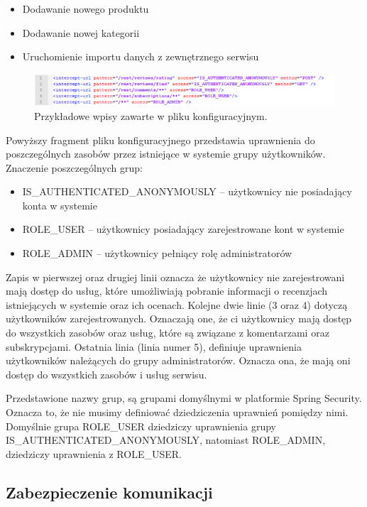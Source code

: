\begin{itemize}
\item Dodawanie nowego produktu
\item Dodawanie nowej kategorii
\item Uruchomienie importu danych z zewnętrznego serwisu
\end{itemize}

\begin{figure}[h]
	\centering
	\includegraphics[scale=0.7]{images/model_uprawnien_xml.png}
	\caption{Przykładowe wpisy zawarte w pliku konfiguracyjnym.}
\end{figure}

Powyższy fragment pliku konfiguracyjnego przedstawia uprawnienia do poszczególnych zasobów przez istniejące w systemie grupy użytkowników. Znaczenie poszczególnych grup:

\begin{itemize}
\item IS\_AUTHENTICATED\_ANONYMOUSLY – użytkownicy nie posiadający konta w systemie
\item ROLE\_USER – użytkownicy posiadający zarejestrowane kont w systemie
\item ROLE\_ADMIN – użytkownicy pełniący rolę administratorów
\end{itemize}

 Zapis w pierwszej oraz drugiej linii oznacza że użytkownicy nie zarejestrowani mają dostęp do usług, które umożliwiają pobranie informacji o recenzjach istniejących w systemie oraz ich ocenach.
Kolejne dwie linie (3 oraz 4) dotyczą użytkowników zarejestrowanych. Oznaczają one, że ci użytkownicy mają dostęp do wszystkich zasobów oraz usług, które są związane z komentarzami oraz subskrypcjami.
Ostatnia linia (linia numer 5), definiuje uprawnienia użytkowników należących do grupy administratorów. Oznacza ona, że mają oni dostęp do wszystkich zasobów i usług serwisu.

Przedstawione nazwy grup, są grupami domyślnymi w platformie Spring Security. Oznacza to, że nie musimy definiować dziedziczenia uprawnień pomiędzy nimi. Domyślnie grupa ROLE\_USER dziedziczy uprawnienia grupy \newline IS\_AUTHENTICATED\_ANONYMOUSLY, natomiast ROLE\_ADMIN, dziedziczy uprawnienia z ROLE\_USER.

\subsection{Zabezpieczenie komunikacji}

